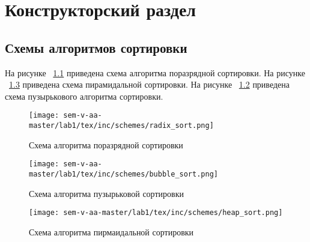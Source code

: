 \chapter{Конструкторский раздел}
\label{cha:design}

\section{Схемы алгоритмов сортировки}
На рисунке ~\ref{fig:radix_sort} приведена схема алгоритма поразрядной сортировки.
На рисунке ~\ref{fig:heap_sort} приведена схема пирамидальной сортировки.
На рисунке ~\ref{fig:bubble_sort} приведена схема пузырькового алгоритма сортировки.

\begin{figure}
    \centering
    \texttt{[image: sem-v-aa-master/lab1/tex/inc/schemes/radix\_sort.png]}
    \caption{Схема алгоритма поразрядной сортировки}
    \label{fig:radix_sort}
\end{figure}

\begin{figure}
    \centering
    \texttt{[image: sem-v-aa-master/lab1/tex/inc/schemes/bubble\_sort.png]}
    \caption{Схема алгоритма пузырьковой сортировки}
    \label{fig:bubble_sort}
\end{figure}

\begin{figure}
    \centering
    \texttt{[image: sem-v-aa-master/lab1/tex/inc/schemes/heap\_sort.png]}
    \caption{Схема алгоритма пирмаидальной сортировки}
    \label{fig:heap_sort}
\end{figure}

